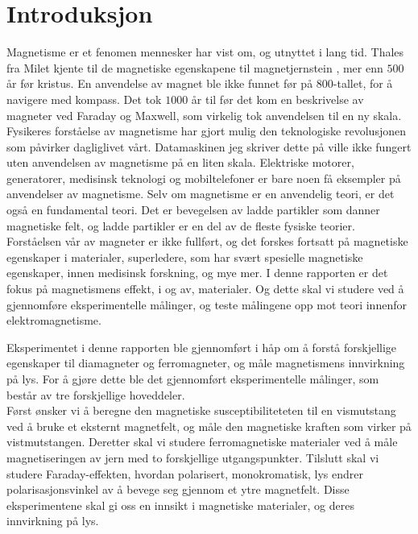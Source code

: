 \documentclass[%
 reprint,
 amsmath,amssymb,
 aps,
 norsk,
]{revtex4-1}
\begin{document}
\section{\label{sec:level1}Introduksjon}
Magnetisme er et fenomen mennesker har vist om, og utnyttet i lang tid. Thales fra Milet kjente til de magnetiske egenskapene til magnetjernstein \cite{holtebekk_magnetisme_2017}, mer enn $500$ år før kristus. En anvendelse av magnet ble ikke funnet før på $800$-tallet, for å navigere med kompass. Det tok  $1000$ år til før det kom en beskrivelse av magneter ved Faraday og Maxwell, som virkelig tok anvendelsen til en ny skala. Fysikeres forståelse av magnetisme har gjort mulig den teknologiske revolusjonen som påvirker dagliglivet vårt. Datamaskinen jeg skriver dette på ville ikke fungert uten anvendelsen av magnetisme på en liten skala. Elektriske motorer, generatorer, medisinsk teknologi og mobiltelefoner er bare noen få eksempler på anvendelser av magnetisme. Selv om magnetisme er en anvendelig teori, er det også en fundamental teori. Det er bevegelsen av ladde partikler som danner magnetiske felt, og ladde partikler er en del av de fleste fysiske teorier. Forståelsen vår av magneter er ikke fullført, og det forskes fortsatt på magnetiske egenskaper i materialer, superledere, som har svært spesielle magnetiske egenskaper, innen medisinsk forskning, og mye mer.
I denne rapporten er det fokus på magnetismens effekt, i og av, materialer. Og dette skal vi studere ved å gjennomføre eksperimentelle målinger, og teste målingene opp mot teori innenfor elektromagnetisme.\par
Eksperimentet i denne rapporten ble gjennomført i håp om å forstå forskjellige egenskaper til diamagneter og ferromagneter, og måle magnetismens innvirkning på lys. For å gjøre dette ble det gjennomført eksperimentelle målinger, som består av tre forskjellige hoveddeler.\\
Først ønsker vi å beregne den magnetiske susceptibiliteteten til en vismutstang ved å bruke et eksternt magnetfelt, og måle den magnetiske kraften som virker på vistmutstangen. Deretter skal vi studere ferromagnetiske materialer ved å måle magnetiseringen av jern med to forskjellige utgangspunkter. Tilslutt skal vi studere Faraday-effekten, hvordan polarisert, monokromatisk, lys endrer polarisasjonsvinkel av å bevege seg gjennom et ytre magnetfelt. Disse eksperimentene skal gi oss en innsikt i magnetiske materialer, og deres innvirkning på lys.
\end{document}
